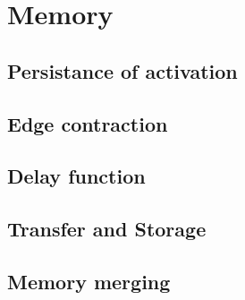\chapter{Memory}
\section{Persistance of activation}
\section{Edge contraction}
\section{Delay function}
\section{Transfer and Storage}
\section{Memory merging}
